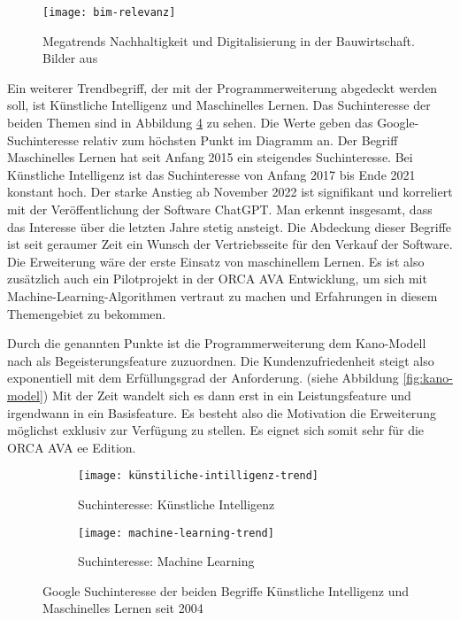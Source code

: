 \begin{figure}[h]
	\centering
	\texttt{[image: bim-relevanz]}
	\caption[Relevanz \ac{bim}]
	{Megatrends Nachhaltigkeit und Digitalisierung in der Bauwirtschaft. Bilder aus \citep[p.~20]{Thomas_Baumanns_Dr_Philipp-Stephan_Freber_Dr_Kai-Stefan_Schober_Dr_Florian_Kirchner2016-gu}}
	\label{fig:bim}
\end{figure}
Ein weiterer Trendbegriff, der mit der Programmerweiterung abgedeckt werden soll, ist \glqq Künstliche Intelligenz\grqq{} und \glqq Maschinelles Lernen\grqq{}. Das Suchinteresse der beiden Themen sind in Abbildung \ref{fig:ki-ml-trend} zu sehen. Die Werte geben das Google-Suchinteresse relativ zum höchsten Punkt im Diagramm an. Der Begriff \glqq Maschinelles Lernen\grqq{} hat seit Anfang 2015 ein steigendes Suchinteresse. Bei \glqq Künstliche Intelligenz\grqq{} ist das Suchinteresse von Anfang 2017 bis Ende 2021 konstant hoch. Der starke Anstieg ab November 2022 ist signifikant und korreliert mit der Veröffentlichung der Software ChatGPT. Man erkennt insgesamt, dass das Interesse über die letzten Jahre stetig ansteigt. Die Abdeckung dieser Begriffe ist seit geraumer Zeit ein Wunsch der Vertriebsseite für den Verkauf der Software. Die Erweiterung wäre der erste Einsatz von maschinellem Lernen. Es ist also zusätzlich auch ein Pilotprojekt in der ORCA AVA Entwicklung, um sich mit Machine-Learning-Algorithmen vertraut zu machen und Erfahrungen in diesem Themengebiet zu bekommen.

Durch die genannten Punkte ist die Programmerweiterung dem Kano-Modell nach als Begeisterungsfeature zuzuordnen. Die Kundenzufriedenheit steigt also exponentiell mit dem Erfüllungsgrad der Anforderung. (siehe Abbildung \ref{fig:kano-model}) Mit der Zeit wandelt sich es dann erst in ein Leistungsfeature und irgendwann in ein Basisfeature. \citep[p.~3-4]{Hölzing_2008} Es besteht also die Motivation die Erweiterung möglichst exklusiv zur Verfügung zu stellen. Es eignet sich somit sehr für die ORCA AVA \ac{ee} Edition.

\begin{figure}[h]
	\centering
	
	\begin{subfigure}{0.99\textwidth}
		\centering
	\texttt{[image: künstiliche-intilligenz-trend]}
		\caption{Suchinteresse: Künstliche Intelligenz}
		\label{FIG:ki-trend}
	\end{subfigure}
	\hspace{1cm}
	\begin{subfigure}{0.99\textwidth}
		\centering
	\texttt{[image: machine-learning-trend]}
		\caption{Suchinteresse: Machine Learning}
		\label{FIG:ml-trend}
	\end{subfigure}
	
	\caption[Google Trends]{Google Suchinteresse der beiden Begriffe \glqq Künstliche Intelligenz\grqq{} und \glqq Maschinelles Lernen{} seit 2004}
	\label{fig:ki-ml-trend}
\end{figure}

